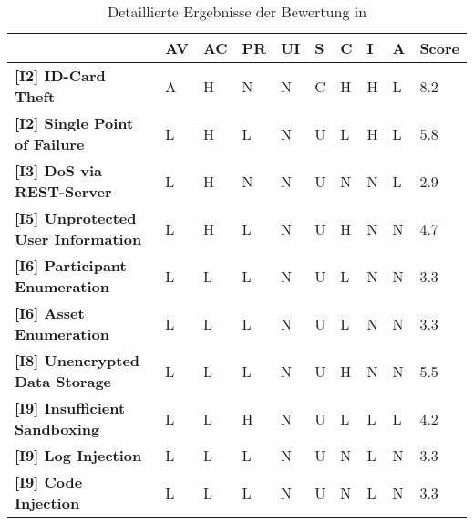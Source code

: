 \begin{sidewaystable}
\centering
\begin{tabularx}{\textwidth}{|l|X|X|X|X|X|X|X|X|l|}
\hline
\textbf{}                                      & \textbf{AV} & \textbf{AC} & \textbf{PR} & \textbf{UI} & \textbf{S} & \textbf{C} & \textbf{I} & \textbf{A} & \textbf{Score} \\ \hline
\textbf{{[}I2{]} ID-Card Theft}                & A           & H           & N           & N           & C          & H          & H          & L          & 8.2            \\ \hline
\textbf{{[}I2{]} Single Point of Failure}      & L           & H           & L           & N           & U          & L          & H          & L          & 5.8            \\ \hline
\textbf{{[}I3{]} DoS via REST-Server}          & L           & H           & N           & N           & U          & N          & N          & L          & 2.9            \\ \hline
\textbf{{[}I5{]} Unprotected User Information} & L           & H           & L           & N           & U          & H          & N          & N          & 4.7            \\ \hline
\textbf{{[}I6{]} Participant Enumeration}      & L           & L           & L           & N           & U          & L          & N          & N          & 3.3            \\ \hline
\textbf{{[}I6{]} Asset Enumeration}            & L           & L           & L           & N           & U          & L          & N          & N          & 3.3            \\ \hline
\textbf{{[}I8{]} Unencrypted Data Storage}     & L           & L           & L           & N           & U          & H          & N          & N          & 5.5            \\ \hline
\textbf{{[}I9{]} Insufficient Sandboxing}      & L           & L           & H           & N           & U          & L          & L          & L          & 4.2            \\ \hline
\textbf{{[}I9{]} Log Injection}                & L           & L           & L           & N           & U          & N          & L          & N          & 3.3            \\ \hline
\textbf{{[}I9{]} Code Injection}               & L           & L           & L           & N           & U          & N          & L          & N          & 3.3            \\ \hline
\end{tabularx}
\caption{Detaillierte Ergebnisse der Bewertung in }
\label{tab:eval_cvss_long}
\end{sidewaystable}


\newpage

